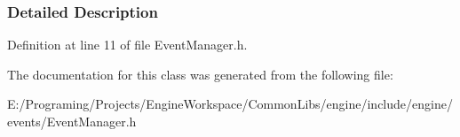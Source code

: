 \subsubsection{Detailed Description}


Definition at line 11 of file Event\+Manager.\+h.



The documentation for this class was generated from the following file\+:\begin{DoxyCompactItemize}
\item 
E\+:/\+Programing/\+Projects/\+Engine\+Workspace/\+Common\+Libs/engine/include/engine/events/Event\+Manager.\+h\end{DoxyCompactItemize}
